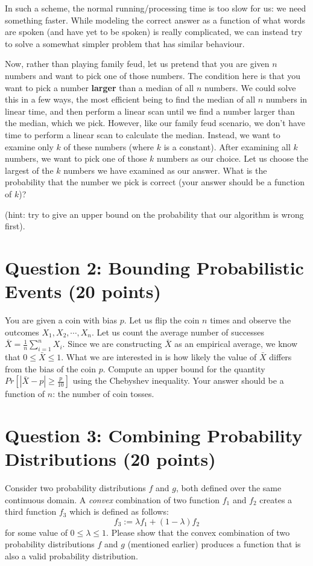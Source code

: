 \documentclass[11pt]{article}
\newcommand{\question}[1]{\section*{\normalsize #1}}
\begin{document}
\noindent In such a scheme, the normal running/processing time is too slow for us: we need something faster. While modeling the correct answer as a function of what words are spoken (and have yet to be spoken) is really complicated, we can instead try to solve a somewhat simpler problem that has similar behaviour.\newline

\noindent Now, rather than playing family feud, let us pretend that you are given $n$ numbers and want to pick one of those numbers. The condition here is that you want to pick a number \textbf{larger} than a median of all $n$ numbers. We could solve this in a few ways, the most efficient being to find the median of all $n$ numbers in linear time, and then perform a linear scan until we find a number larger than the median, which we pick. However, like our family feud scenario, we don't have time to perform a linear scan to calculate the median. Instead, we want to examine only $k$ of these numbers (where $k$ is a constant). After examining all $k$ numbers, we want to pick one of those $k$ numbers as our choice. Let us choose the largest of the $k$ numbers we have examined as our answer. What is the probability that the number we pick is correct (your answer should be a function of $k$)?\newline\newline

\noindent (hint: try to give an upper bound on the probability that our algorithm is wrong first).\newpage


\question{Question 2: Bounding Probabilistic Events (20 points)}
You are given a coin with bias $p$. Let us flip the coin $n$ times and observe the outcomes $X_1, X_2, \cdots, X_n$. Let us count the average number of successes $\bar{X} = \frac{1}{n}\sum\limits_{i=1}^n X_i$. Since we are constructing $\bar{X}$ as an empirical average, we know that $0\le \bar{X}\le 1$. What we are interested in is how likely the value of $\bar{X}$ differs from the bias of the coin $p$. Compute an upper bound for the quantity $Pr[|\bar{X} - p| \ge \frac{p}{10}]$ using the Chebyshev inequality. Your answer should be a function of $n$: the number of coin tosses.\newpage




\question{Question 3: Combining Probability Distributions (20 points)}
Consider two probability distributions $f$ and $g$, both defined over the same continuous domain. A \textit{convex} combination of two function $f_1$ and $f_2$ creates a third function $f_3$ which is defined as follows:
$$f_3 := \lambda f_1 + (1-\lambda)f_2$$
for some value of $0\le \lambda \le 1$. Please show that the convex combination of two probability distributions $f$ and $g$ (mentioned earlier) produces a function that is also a valid probability distribution.\newpage
\end{document}
